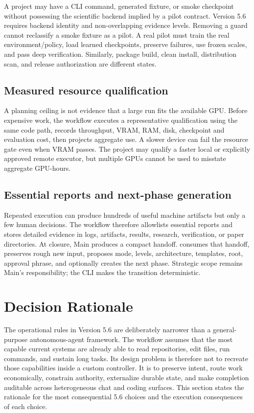 \documentclass[11pt,a4paper]{article}
\newcommand{\code}[1]{\texttt{\detokenize{#1}}}
\begin{document}
A project may have a CLI command, generated fixture, or smoke checkpoint without possessing the
scientific backend implied by a pilot contract. Version 5.6 requires backend identity and
non-overlapping evidence levels. Removing a guard cannot reclassify a smoke fixture as a pilot. A
real pilot must train the real environment/policy, load learned checkpoints, preserve failures,
use frozen scales, and pass deep verification. Similarly, package build, clean install, distribution
scan, and release authorization are different states.

\subsection{Measured resource qualification}

A planning ceiling is not evidence that a large run fits the available GPU. Before expensive work,
the workflow executes a representative qualification using the same code path, records throughput,
VRAM, RAM, disk, checkpoint and evaluation cost, then projects aggregate use. A slower device can
fail the resource gate even when VRAM passes. The project may qualify a faster local or explicitly
approved remote executor, but multiple GPUs cannot be used to misstate aggregate GPU-hours.

\subsection{Essential reports and next-phase generation}

Repeated execution can produce hundreds of useful machine artifacts but only a few human decisions.
The workflow therefore allowlists essential reports and stores detailed evidence in logs, artifacts,
results, research, verification, or paper directories. At closure, Main produces a compact handoff.
\code{aw phase plan-next} consumes that handoff, preserves rough new input, proposes mode, levels,
architecture, templates, root, approval phrase, and optionally creates the next phase. Strategic
scope remains Main's responsibility; the CLI makes the transition deterministic.


\section{Decision Rationale}\label{sec:decision-rationale}

The operational rules in Version 5.6 are deliberately narrower than a general-purpose autonomous-agent framework. The workflow assumes that the most capable current systems are already able to read repositories, edit files, run commands, and sustain long tasks. Its design problem is therefore not to recreate those capabilities inside a custom controller. It is to preserve intent, route work economically, constrain authority, externalize durable state, and make completion auditable across heterogeneous chat and coding surfaces. This section states the rationale for the most consequential 5.6 choices and the execution consequences of each choice.
\end{document}
